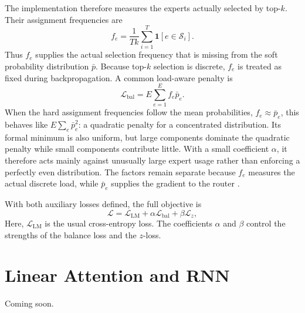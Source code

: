 \documentclass[11pt]{article}
\begin{document}
The implementation therefore measures the experts actually selected by
top-$k$.  Their assignment frequencies are
\begin{equation}
  f_e=\frac{1}{Tk}\sum_{i=1}^{T}\mathbf{1}\!\left[e\in\mathcal{S}_i\right].
  \label{eq:moe-load-statistics}
\end{equation}
Thus $f_e$ supplies the actual selection frequency that is missing from the soft
probability distribution $\bar p$.  Because top-$k$ selection is discrete,
$f_e$ is treated as fixed during backpropagation.  A common load-aware penalty is
\begin{equation}
  \mathcal{L}_{\mathrm{bal}}
  =E\sum_{e=1}^{E}f_e\bar p_e.
  \label{eq:moe-balance-loss}
\end{equation}
When the hard assignment frequencies follow the mean probabilities,
$f_e\approx\bar p_e$, this behaves like $E\sum_e\bar p_e^2$: a quadratic penalty
for a concentrated distribution.  Its formal minimum is also uniform, but
large components dominate the quadratic penalty while small components
contribute little.  With a small coefficient $\alpha$, it therefore acts mainly
against unusually large expert usage rather than enforcing a perfectly even
distribution.  The factors remain separate because $f_e$ measures the actual
discrete load, while $\bar p_e$ supplies the gradient to the router
\citep{fedus2022switch,qiu2025loadbalancing,hashimoto2026attentionmoe}.

With both auxiliary losses defined, the full objective is
\begin{equation}
  \mathcal{L}
  =\mathcal{L}_{\mathrm{LM}}
   +\alpha\mathcal{L}_{\mathrm{bal}}
   +\beta\mathcal{L}_{z},
  \label{eq:moe-training-loss}
\end{equation}
Here, $\mathcal{L}_{\mathrm{LM}}$ is the usual cross-entropy loss.  The
coefficients $\alpha$ and $\beta$ control the strengths of the balance loss and
the $z$-loss.

\section{Linear Attention and RNN}

Coming soon.



\end{document}
